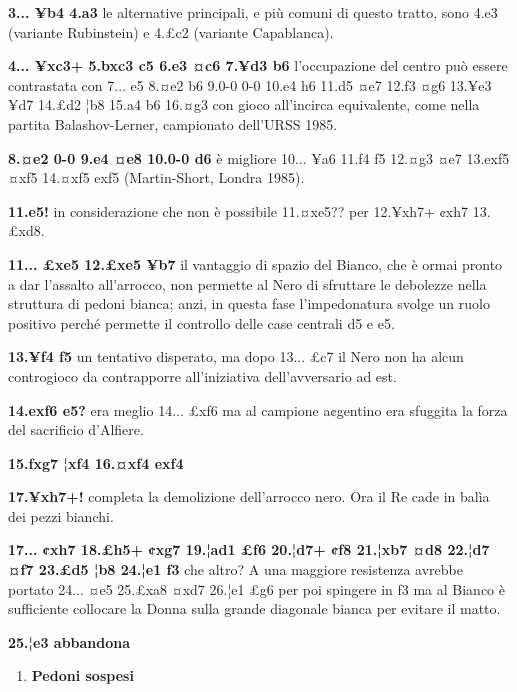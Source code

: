 \textbf{3... ¥b4 4.a3} le alternative principali, e più comuni di questo
tratto, sono 4.e3 (variante Rubinstein) e 4.£c2 (variante Capablanca).

\textbf{4... ¥xc3+ 5.bxc3 c5 6.e3 ¤c6 7.¥d3 b6} l'occupazione del centro
può essere contrastata con 7... e5 8.¤e2 b6 9.0-0 0-0 10.e4 h6 11.d5 ¤e7
12.f3 ¤g6 13.¥e3 ¥d7 14.£d2 ¦b8 15.a4 b6 16.¤g3 con gioco all'incirca
equivalente, come nella partita Balashov-Lerner, campionato dell'URSS
1985.

\textbf{8.¤e2 0-0 9.e4 ¤e8 10.0-0 d6} è migliore 10... ¥a6 11.f4 f5
12.¤g3 ¤e7 13.exf5 ¤xf5 14.¤xf5 exf5 (Martin-Short, Londra 1985).

\textbf{11.e5!} in considerazione che non è possibile 11.¤xe5?? per
12.¥xh7+ ¢xh7 13.£xd8.

\textbf{11... £xe5 12.£xe5 ¥b7} il vantaggio di spazio del Bianco, che è
ormai pronto a dar l'assalto all'arrocco, non permette al Nero di
sfruttare le debolezze nella struttura di pedoni bianca; anzi, in questa
fase l'impedonatura svolge un ruolo positivo perché permette il
controllo delle case centrali d5 e e5.

\textbf{13.¥f4 f5} un tentativo disperato, ma dopo 13... £c7 il Nero non
ha alcun controgioco da contrapporre all'iniziativa dell'avversario ad
est.

\textbf{14.exf6 e5?} era meglio 14... £xf6 ma al campione a¢gentino era
sfuggita la forza del sacrificio d'Alfiere.

\textbf{15.fxg7 ¦xf4 16.¤xf4 exf4}


\textbf{17.¥xh7+!} completa la demolizione dell'arrocco nero. Ora il Re
cade in balìa dei pezzi bianchi.

\textbf{17... ¢xh7 18.£h5+ ¢xg7 19.¦ad1 £f6 20.¦d7+ ¢f8 21.¦xb7 ¤d8
22.¦d7 ¤f7 23.£d5 ¦b8 24.¦e1 f3} che altro? A una maggiore resistenza
avrebbe portato 24... ¤e5 25.£xa8 ¤xd7 26.¦e1 £g6 per poi spingere in f3
ma al Bianco è sufficiente collocare la Donna sulla grande diagonale
bianca per evitare il matto.

\textbf{25.¦e3 abbandona}

\begin{enumerate}
\def\labelenumi{\alph{enumi})}
\setcounter{enumi}{3}
\item
  \textbf{Pedoni sospesi}
\end{enumerate}


